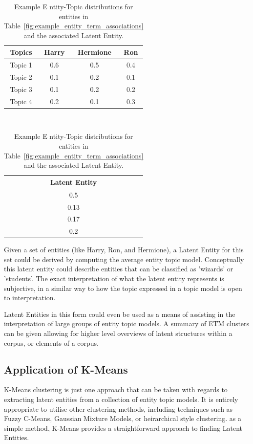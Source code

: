 \documentclass[10pt]{report}
\begin{document}
\begin{table}[h!]
  \centering
    \begin{tabular}{*4c}
      Topics&Harry&Hermione&Ron\\
      \hline
      Topic 1 & 0.6 & 0.5  & 0.4 \\
      Topic 2 & 0.1 & 0.2  & 0.1 \\
      Topic 3 & 0.1 & 0.2  & 0.2 \\
      Topic 4 & 0.2 & 0.1  & 0.3 \\  
    \end{tabular}
    \vline \,
    \begin{tabular}{*1c}
      \multicolumn{1}{c}{Latent Entity}\\
      \hline
      0.5 \\
      0.13 \\
      0.17\\
      0.2\\
      
      \end{tabular}
      \caption{Example E
        ntity-Topic distributions for entities in Table~\ref{fig:example_entity_term_associations} and the associated Latent Entity. \label{fig:example_entity_topic_distribution}}
\end{table}

Given a set of entities (like Harry, Ron, and Hermione), a Latent Entity for this set could be derived by computing the average entity topic model. Conceptually this latent entity could describe entities that can be classified as 'wizards' or 'students'. The exact interpretation of what the latent entity represents is subjective, in a similar way to how the topic expressed in a topic model is open to interpretation.

Latent Entities in this form could even be used as a means of assisting in the interpretation of large groups of entity topic models. A summary of ETM clusters can be given allowing for higher level overviews of latent structures within a corpus, or elements of a corpus.

\subsection{Application of K-Means}
K-Means clustering is just one approach that can be taken with regards to extracting latent entities from a collection of entity topic models. It is entirely appropriate to utilise other clustering methods, including techniques such as Fuzzy C-Means, Gaussian Mixture Models, or heirarchical style clustering. as a simple method, K-Means provides a straightforward approach to finding Latent Entities.
\end{document}
